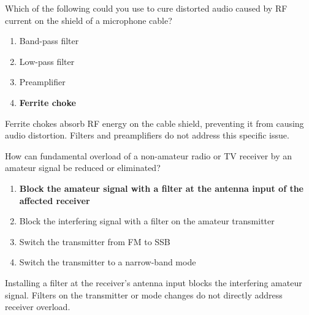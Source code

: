 
\begin{tcolorbox}[colback=gray!10!white,colframe=black!75!black,title={T7B04}]
    Which of the following could you use to cure distorted audio caused by RF current on the shield of a microphone cable?
    \begin{enumerate}[label=\Alph*,noitemsep]
        \item Band-pass filter
        \item Low-pass filter
        \item Preamplifier
        \item \textbf{Ferrite choke}
    \end{enumerate}
\end{tcolorbox}
Ferrite chokes absorb RF energy on the cable shield, preventing it from causing audio distortion. Filters and preamplifiers do not address this specific issue.


\begin{tcolorbox}[colback=gray!10!white,colframe=black!75!black,title={T7B05}]
    How can fundamental overload of a non-amateur radio or TV receiver by an amateur signal be reduced or eliminated?
    \begin{enumerate}[label=\Alph*,noitemsep]
        \item \textbf{Block the amateur signal with a filter at the antenna input of the affected receiver}
        \item Block the interfering signal with a filter on the amateur transmitter
        \item Switch the transmitter from FM to SSB
        \item Switch the transmitter to a narrow-band mode
    \end{enumerate}
\end{tcolorbox}
Installing a filter at the receiver's antenna input blocks the interfering amateur signal. Filters on the transmitter or mode changes do not directly address receiver overload.


